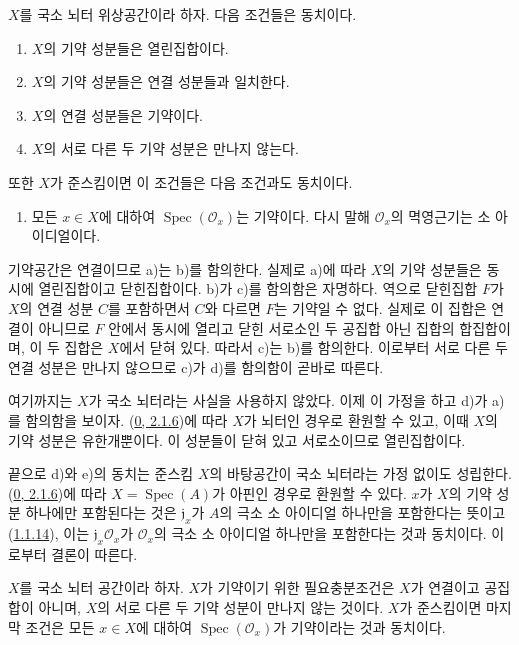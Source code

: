 \begin{proposition}[6.1.10]
\label{I.6.1.10-ko}
$X$를 국소 뇌터 위상공간이라 하자. 다음 조건들은 동치이다.
\begin{enumerate}
  \item[a)] $X$의 기약 성분들은 열린집합이다.
  \item[b)] $X$의 기약 성분들은 연결 성분들과 일치한다.
  \item[c)] $X$의 연결 성분들은 기약이다.
  \item[d)] $X$의 서로 다른 두 기약 성분은 만나지 않는다.
\end{enumerate}

또한 $X$가 준스킴이면 이 조건들은 다음 조건과도 동치이다.
\begin{enumerate}
  \item[e)] 모든 $x\in X$에 대하여
    $\operatorname{Spec}(\mathscr{O}_x)$는 기약이다. 다시 말해
    $\mathscr{O}_x$의 멱영근기는 소 아이디얼이다.
\end{enumerate}
\end{proposition}

기약공간은 연결이므로 a)는 b)를 함의한다. 실제로 a)에 따라 $X$의
기약 성분들은 동시에 열린집합이고 닫힌집합이다. b)가 c)를 함의함은
자명하다. 역으로 닫힌집합 $F$가
$X$의 연결 성분 $C$를 포함하면서 $C$와 다르면 $F$는 기약일 수
없다. 실제로 이 집합은 연결이 아니므로
$F$ 안에서 동시에 열리고 닫힌 서로소인 두 공집합 아닌 집합의
합집합이며, 이 두 집합은 $X$에서 닫혀 있다. 따라서 c)는 b)를
함의한다. 이로부터 서로 다른 두 연결 성분은 만나지 않으므로 c)가
d)를 함의함이 곧바로 따른다.

여기까지는 $X$가 국소 뇌터라는 사실을 사용하지 않았다. 이제 이
가정을 하고 d)가 a)를 함의함을 보이자. (\hyperref[0.2.1.6-ko]{0,
2.1.6})에 따라 $X$가 뇌터인 경우로 환원할 수 있고, 이때 $X$의 기약
성분은 유한개뿐이다. 이 성분들이 닫혀 있고 서로소이므로 열린집합이다.

끝으로 d)와 e)의 동치는 준스킴 $X$의 바탕공간이 국소 뇌터라는
가정 없이도 성립한다. (\hyperref[0.2.1.6-ko]{0, 2.1.6})에 따라
$X=\operatorname{Spec}(A)$가 아핀인 경우로 환원할 수 있다. $x$가
$X$의 기약 성분 하나에만 포함된다는 것은
$\mathfrak{j}_x$가 $A$의 극소 소 아이디얼 하나만을 포함한다는 뜻이고
(\hyperref[I.1.1.14-ko]{1.1.14}), 이는
$\mathfrak{j}_x\mathscr{O}_x$가 $\mathscr{O}_x$의 극소 소 아이디얼
하나만을 포함한다는 것과 동치이다. 이로부터 결론이 따른다.

\begin{corollary}[6.1.11]
\label{I.6.1.11-ko}
$X$를 국소 뇌터 공간이라 하자. $X$가 기약이기 위한 필요충분조건은
$X$가 연결이고 공집합이 아니며, $X$의 서로 다른 두 기약 성분이
만나지 않는 것이다. $X$가 준스킴이면 마지막 조건은 모든 $x\in X$에
대하여 $\operatorname{Spec}(\mathscr{O}_x)$가 기약이라는 것과
동치이다.
\end{corollary}

